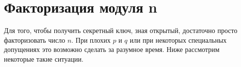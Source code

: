 \documentclass[12pt,a4paper]{scrartcl}
\begin{document}
\section{Факторизация модуля n} 

Для того, чтобы получить секретный	 ключ, зная открытый, достаточно просто факторизовать число $n$. При плохих $p$ и $q$ или при некоторых специальных допущениях это возможно сделать за разумное время. Ниже рассмотрим некоторые такие ситуации.
\end{document}

